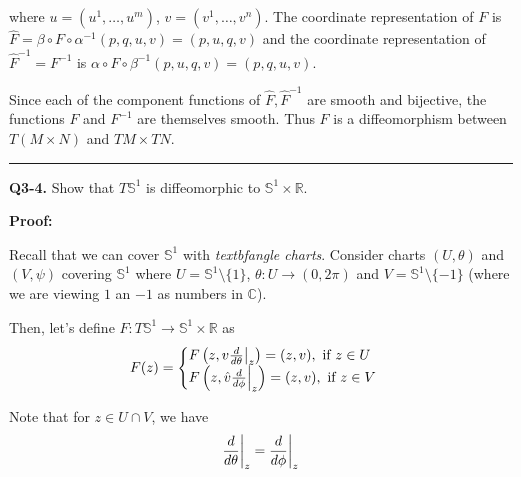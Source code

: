 \documentclass{article}
\newcommand{\R}{\mathbb{R}}
\newcommand{\C}{\mathbb{C}}
\newcommand{\restr}[2]{{%
  \left.\kern-\nulldelimiterspace %
  #1 %
  \vphantom{\big|} %
  \right|_{#2} %
  }}
\begin{document}
where $u = \left( u^1, \dots, u^m \right)$, $v = \left( v^1, \dots, v^n \right)$. The coordinate representation of $F$ is $\hat{F} = \beta \circ F \circ \alpha^{-1}(p, q, u, v) = (p, u, q, v)$ and the coordinate representation of $\hat{F}^{-1} = F^{-1}$ is $\alpha \circ F \circ \beta^{-1}(p, u, q, v) = (p, q, u, v)$.

\vskip 0.5cm
Since each of the component functions of $\hat{F}, \hat{F}^{-1}$ are smooth and bijective, the functions $F$ and $F^{-1}$ are themselves smooth. Thus $F$ is a diffeomorphism between $T(M \times N)$ and $TM \times TN$.

\vskip 0.5cm
\hrule 
\vskip 0.5cm


\textbf{Q3-4.} Show that $T\mathbb{S}^1$ is diffeomorphic to $\mathbb{S}^1 \times \mathbb{R}$.

\vskip 0.5cm
\textbf{Proof:}


Recall that we can cover $\mathbb{S}^1$ with \emph{textbf{angle charts}}. Consider charts $(U, \theta)$ and $(V, \psi)$ covering $\mathbb{S}^1$ where $U = \mathbb{S}^1 \setminus \{1\}$, $\theta : U \rightarrow (0, 2\pi)$ and $V = \mathbb{S}^1 \setminus \{-1\}$ (where we are viewing $1$ an $-1$ as numbers in $\C$).

\vsize 0.5cm
Then, let's define $F : T\mathbb{S}^1 \rightarrow \mathbb{S}^1 \times \R$ as
\[ F(z) = \begin{cases}
  F\left(z, v\restr{\frac{d}{d\theta}}{z}\right) = (z, v), \text{ if } z \in U\\
  F\left(z, \hat{v}\restr{\frac{d}{d\phi}}{z}\right) = (z, v), \text{ if } z \in V
\end{cases} \]

Note that for $z \in U \cap V$, we have 
\[ \restr{\frac{d}{d\theta}}{z} = \restr{\frac{d}{d\phi}}{z} \]
\end{document}
